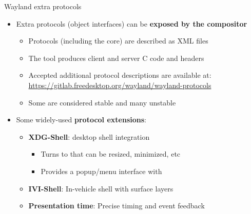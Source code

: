 \begin{frame}{Wayland extra protocols}
  \begin{itemize}
  \item Extra protocols (object interfaces) can be \textbf{exposed by the compositor}
    \begin{itemize}
    \item Protocols (including the core) are described as XML files
    \item The  tool produces client and server C code and headers
    \item Accepted additional protocol descriptions are available at:
      \url{https://gitlab.freedesktop.org/wayland/wayland-protocols}
    \item Some are considered stable and many unstable
    \end{itemize}
  \item Some widely-used \textbf{protocol extensions}:
    \begin{itemize}
    \item \textbf{XDG-Shell}: desktop shell integration
      \begin{itemize}
      \item Turns  to  that can be resized, minimized, etc
      \item Provides a popup/menu interface with 
      \end{itemize}
    \item \textbf{IVI-Shell}: In-vehicle shell with surface layers
    \item \textbf{Presentation time}: Precise timing and event feedback
    \end{itemize}
  \end{itemize}
\end{frame}

